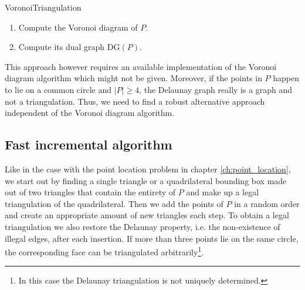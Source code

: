         \begin{outline}{VoronoiTriangulation} 
            \begin{enumerate}
                \item Compute the Voronoi diagram of $P$. 
                \item Compute its dual graph $\text{DG}(P)$.
            \end{enumerate}
        \end{outline}

        This approach however requires an available implementation of the Voronoi diagram algorithm which might not be given. Moreover, if the points in $P$ happen to lie on a common circle and $\vert P \vert \geq 4$, the Delaunay graph really is a graph and not a triangulation. Thus, we need to find a robust alternative approach independent of the Voronoi diagram algorithm. 

    \subsection{Fast incremental algorithm}
        Like in the case with the point location problem in chapter \ref{ch:point_location}, we start out by finding a single triangle or a quadrilateral bounding box made out of two triangles that contain the entirety of $P$ and make up a legal triangulation of the quadrilateral. Then we add the points of $P$ in a random order and create an appropriate amount of new triangles each step. To obtain a legal triangulation we also restore the Delaunay property, i.e. the non-existence of illegal edges, after each insertion. If more than three points lie on the same circle, the corresponding face can be triangulated arbitrarily\footnote{In this case the Delaunay triangulation is not uniquely determined.}. 

